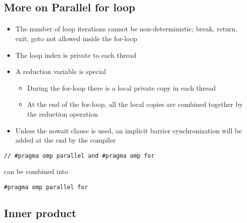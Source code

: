 \documentclass[%
oneside,                 %
final,                   %
10pt]{article}
\begin{document}
\subsection*{More on Parallel for loop}

\paragraph{}
\begin{itemize}
\item The number of loop iterations cannot be non-deterministic; break, return, exit, goto not allowed inside the for-loop

\item The loop index is private to each thread

\item A reduction variable is special
\begin{itemize}

  \item During the for-loop there is a local private copy in each thread

  \item At the end of the for-loop, all the local copies are combined together by the reduction operation

\end{itemize}

\noindent
\item Unless the nowait clause is used, an implicit barrier synchronization will be added at the end by the compiler
\end{itemize}

\noindent
\begin{verbatim}
// #pragma omp parallel and #pragma omp for
\end{verbatim}
can be combined into
\begin{verbatim}
#pragma omp parallel for
\end{verbatim}



\subsection*{Inner product}
\end{document}
